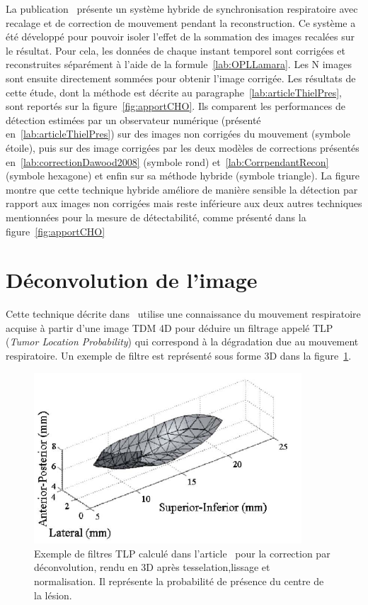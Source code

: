  La publication~\cite{Thielemans2006Lesion} présente un système hybride de synchronisation respiratoire avec recalage et de correction de mouvement pendant la reconstruction. Ce système a été développé pour pouvoir isoler l'effet de la sommation des images recalées sur le résultat. Pour cela, les données de chaque instant temporel sont corrigées et reconstruites séparément à l'aide de la formule~\ref{lab:OPLLamara}. Les N images sont ensuite directement sommées pour obtenir l'image corrigée. Les résultats de cette étude, dont la méthode est décrite au paragraphe~\ref{lab:articleThielPres}, sont reportés sur la figure~\ref{fig:apportCHO}. Ils comparent les performances de détection estimées par un observateur numérique (présenté en~\ref{lab:articleThielPres}) sur des images non corrigées du mouvement (symbole étoile), puis sur des image corrigées par les deux modèles de corrections présentés en~\ref{lab:correctionDawood2008} (symbole rond) et~\ref{lab:CorrpendantRecon} (symbole hexagone) et enfin sur sa méthode hybride (symbole triangle). La figure montre que cette technique hybride améliore de manière sensible la détection par rapport aux images non corrigées mais reste inférieure aux deux autres techniques mentionnées pour la mesure de détectabilité, comme présenté dans la figure~\ref{fig:apportCHO}
\label{lab:evolGating}

\section{Déconvolution de l'image}

Cette technique décrite dans~\cite{naqa2006deblurring} utilise une connaissance du mouvement respiratoire acquise à partir d'une image TDM 4D pour déduire un filtrage appelé TLP (\textit{Tumor Location Probability}) qui correspond à la dégradation due au mouvement respiratoire. Un exemple de filtre est représenté sous forme 3D dans la figure~\ref{fig:formeTLP}.

\begin{figure}[h!]
	\begin{center}
		\includegraphics[width=10cm]{images/formeTLP}
	\end{center}
	\caption[Exemple de filtres TLP pour la correction par déconvolution]{Exemple de filtres TLP calculé dans l'article~\cite{naqa2006deblurring} pour la correction par déconvolution, rendu en 3D après tesselation,lissage et normalisation. Il représente la probabilité de présence du centre de la lésion.} 
	\label{fig:formeTLP}
\end{figure}



